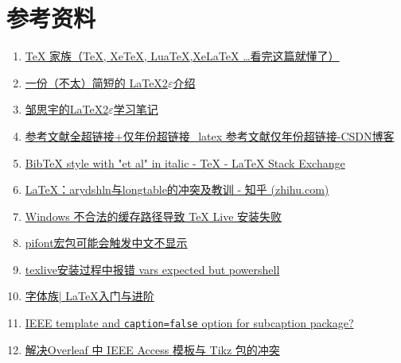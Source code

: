 \chapter*{参考资料}\label{chap:refinfor}
\begin{enumerate}[itemsep=1.5ex]
    \item \href{https://zhuanlan.zhihu.com/p/248669482}{TeX 家族（TeX, XeTeX, LuaTeX,XeLaTeX …看完这篇就懂了）}
    \item \href{http://mirrors.ctan.org/info/lshort/chinese/lshort-zh-cn.pdf}{一份（不太）简短的 \LaTeX{}2$\varepsilon$介绍}
    \item \href{https://github.com/zousiyu1995/Study-LaTeX}{邹思宇的\LaTeX{}2$\varepsilon$学习笔记}
    \item \href{https://blog.csdn.net/qq_36829039/article/details/123576507}{参考文献全超链接+仅年份超链接\_latex 参考文献仅年份超链接-CSDN博客}
    \item \href{https://tex.stackexchange.com/questions/532367/bibtex-style-with-et-al-in-italic}{BibTeX style with "et al" in italic - TeX - LaTeX Stack Exchange}
    \item \href{https://zhuanlan.zhihu.com/p/667681242}{LaTeX：arydshln与longtable的冲突及教训 - 知乎 (zhihu.com)}
    \item \href{https://syvshc.github.io/2021-04-07-illegal-temp-cause-tlinstall-failure/}{Windows 不合法的缓存路径导致 TeX Live 安装失败}
    \item \href{https://github.com/CTeX-org/ctex-kit/issues/688}{pifont宏包可能会触发中文不显示}
    \item \href{https://blog.csdn.net/qq_50698753/article/details/130475564}{texlive安装过程中报错 vars expected but powershell}
    \item \href{https://latex.lierhua.top/zh/docs/%E5%AD%97%E4%BD%93%E6%97%8F/}{字体族| \LaTeX{}入门与进阶}
    \item \href{https://tex.stackexchange.com/questions/154435/ieee-template-and-caption-false-option-for-subcaption-package}{IEEE template and \lstinline{caption=false} option for subcaption package?}
    \item \href{https://www.cnblogs.com/greatestchen/p/17006317.html}{解决Overleaf 中 IEEE Access 模板与 Tikz 包的冲突}
\end{enumerate}